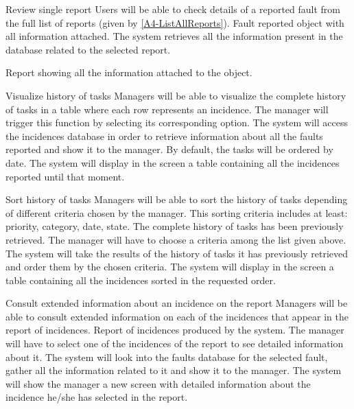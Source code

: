 \begin{requirement}{Review single report}
\reqdesc Users will be able to check details of a reported fault from the full list of reports (given by \ref{A4-ListAllReports}).
\reqin Fault reported object with all information attached.
\reqsteps The system retrieves all the information present in the database related to the selected report.

\reqout Report showing all the information attached to the object.
\end{requirement}


\begin{requirement}{Visualize history of tasks}
\reqdesc Managers will be able to visualize the complete
history of tasks in a table where each row represents an incidence.
\reqin The manager will trigger this function by selecting its corresponding option.
\reqsteps The system will access the incidences database in order to retrieve information about all the faults reported and show it to the manager. By default, the tasks will be ordered by date.
\reqout The system will display in the screen a table containing all the incidences reported until that moment.
\end{requirement}

\begin{requirement}{Sort history of tasks}
\reqdesc Managers will be able to sort the history of tasks depending of different criteria chosen by the manager. This sorting criteria includes at least: priority, category, date, state.
\reqin The complete history of tasks has been previously retrieved. The manager will have to choose a criteria among the list given above.
\reqsteps The system will take the results of the history of tasks it has previously retrieved and order them by the chosen criteria.
\reqout The system will display in the screen a table containing all the incidences sorted in the requested order.
\end{requirement}

\begin{requirement}{Consult extended information about an incidence on the report}
\reqdesc Managers will be able to consult extended information on each of the incidences that appear in the report of incidences.
\reqin Report of incidences produced by the system. The manager will have to select one of the incidences of the report to see detailed information about it.
\reqsteps The system will look into the faults database for the selected fault, gather all the information related to it and show it to the manager.
\reqout The system will show the manager a new screen with detailed information about the incidence he/she has selected in the report.
\end{requirement}

